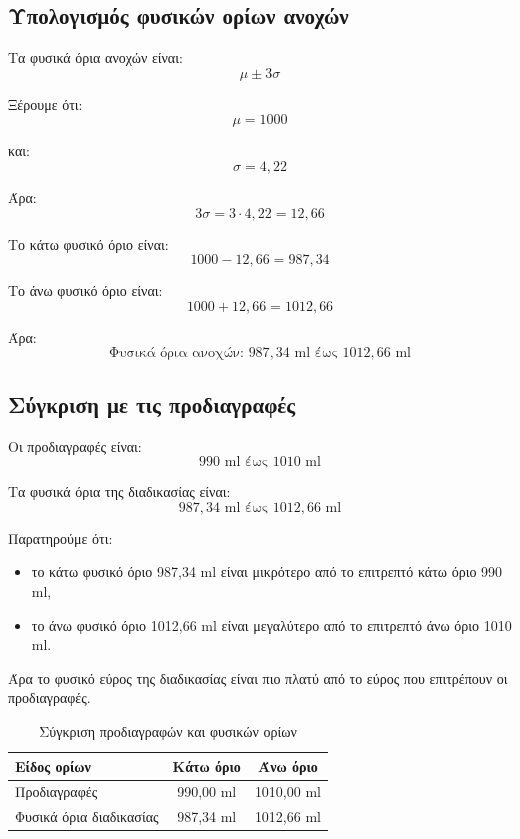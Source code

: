 \documentclass[12pt,a4paper]{article}
\begin{document}
\subsection{Υπολογισμός φυσικών ορίων ανοχών}

Τα φυσικά όρια ανοχών είναι:
\[
\mu\pm3\sigma
\]

Ξέρουμε ότι:
\[
\mu=1000
\]

και:
\[
\sigma=4{,}22
\]

Άρα:
\[
3\sigma=3\cdot4{,}22=12{,}66
\]

Το κάτω φυσικό όριο είναι:
\[
1000-12{,}66=987{,}34
\]

Το άνω φυσικό όριο είναι:
\[
1000+12{,}66=1012{,}66
\]

Άρα:
\[
\boxed{\text{Φυσικά όρια ανοχών: } 987{,}34 \text{ ml έως } 1012{,}66 \text{ ml}}
\]

\subsection{Σύγκριση με τις προδιαγραφές}

Οι προδιαγραφές είναι:
\[
990 \text{ ml έως } 1010 \text{ ml}
\]

Τα φυσικά όρια της διαδικασίας είναι:
\[
987{,}34 \text{ ml έως } 1012{,}66 \text{ ml}
\]

Παρατηρούμε ότι:

\begin{itemize}
    \item το κάτω φυσικό όριο 987,34 ml είναι μικρότερο από το επιτρεπτό κάτω όριο 990 ml,
    \item το άνω φυσικό όριο 1012,66 ml είναι μεγαλύτερο από το επιτρεπτό άνω όριο 1010 ml.
\end{itemize}

Άρα το φυσικό εύρος της διαδικασίας είναι πιο πλατύ από το εύρος που επιτρέπουν οι προδιαγραφές.

\begin{table}[H]
\centering
\caption{Σύγκριση προδιαγραφών και φυσικών ορίων}
\begin{tabular}{lcc}
\toprule
\textbf{Είδος ορίων} & \textbf{Κάτω όριο} & \textbf{Άνω όριο} \\
\midrule
Προδιαγραφές & 990,00 ml & 1010,00 ml \\
Φυσικά όρια διαδικασίας & 987,34 ml & 1012,66 ml \\
\bottomrule
\end{tabular}
\end{table}
\end{document}
